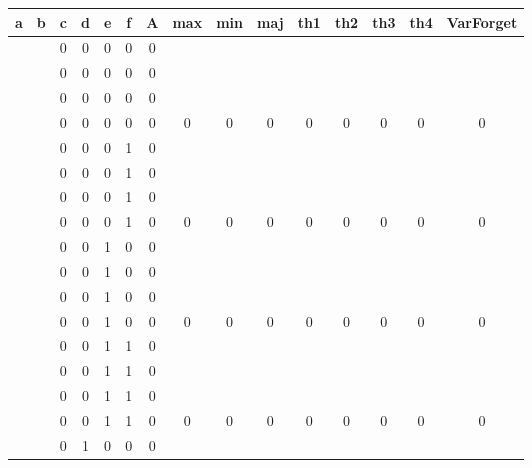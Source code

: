 \begin{table}[!tb]
    \centering
    \begin{tabular}{|c|c|c|c|c|c|c|c|c|c|c|c|c|c|c|}
        \hline
        \textbf{a} & \textbf{b} & \textbf{c} & \textbf{d} & \textbf{e} & \textbf{f} & \textbf{A} & \textbf{max} & \textbf{min} & \textbf{maj} & \textbf{th1} & \textbf{th2} & \textbf{th3} & \textbf{th4} & \textbf{VarForget} \\ \hline
        \rowcolor{gray!40}  &  & 0 & 0 & 0 & 0 & 0 &  &  &  &  &  &  &  &  \\ \hline
        \rowcolor{gray!40}  &  & 0 & 0 & 0 & 0 & 0 &  &  &  &  &  &  &  &  \\ \hline
        \rowcolor{gray!40}  &  & 0 & 0 & 0 & 0 & 0 &  &  &  &  &  &  &  &  \\ \hline
        \rowcolor{gray!40}  &  & 0 & 0 & 0 & 0 & 0 & 0 & 0 & 0 & 0 & 0 & 0 & 0 & 0 \\ \hline
        \rowcolor{blue!40}  &  & 0 & 0 & 0 & 1 & 0 &  &  &  &  &  &  &  &  \\ \hline
        \rowcolor{blue!40}  &  & 0 & 0 & 0 & 1 & 0 &  &  &  &  &  &  &  &  \\ \hline
        \rowcolor{blue!40}  &  & 0 & 0 & 0 & 1 & 0 &  &  &  &  &  &  &  &  \\ \hline
        \rowcolor{blue!40}  &  & 0 & 0 & 0 & 1 & 0 & 0 & 0 & 0 & 0 & 0 & 0 & 0 & 0 \\ \hline
        \rowcolor{red!40}  &  & 0 & 0 & 1 & 0 & 0 &  &  &  &  &  &  &  &  \\ \hline
        \rowcolor{red!40}  &  & 0 & 0 & 1 & 0 & 0 &  &  &  &  &  &  &  &  \\ \hline
        \rowcolor{red!40}  &  & 0 & 0 & 1 & 0 & 0 &  &  &  &  &  &  &  &  \\ \hline
        \rowcolor{red!40}  &  & 0 & 0 & 1 & 0 & 0 & 0 & 0 & 0 & 0 & 0 & 0 & 0 & 0 \\ \hline
        \rowcolor{green!40}  &  & 0 & 0 & 1 & 1 & 0 &  &  &  &  &  &  &  &  \\ \hline
        \rowcolor{green!40}  &  & 0 & 0 & 1 & 1 & 0 &  &  &  &  &  &  &  &  \\ \hline
        \rowcolor{green!40}  &  & 0 & 0 & 1 & 1 & 0 &  &  &  &  &  &  &  &  \\ \hline
        \rowcolor{green!40}  &  & 0 & 0 & 1 & 1 & 0 & 0 & 0 & 0 & 0 & 0 & 0 & 0 & 0 \\ \hline
        \rowcolor{yellow!40}  &  & 0 & 1 & 0 & 0 & 0 &  &  &  &  &  &  &  &  \\ \hline

\end{tabular}
\end{table}
